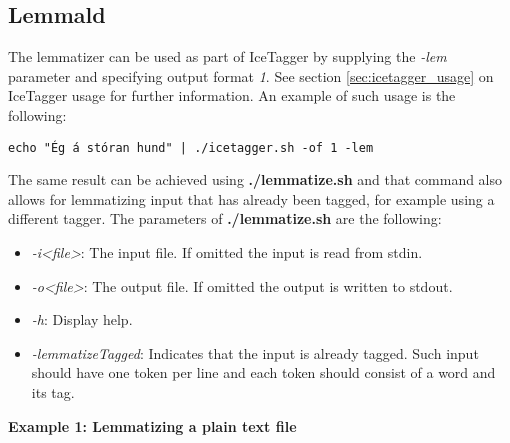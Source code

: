 \documentclass[11pt]{article}
\begin{document}



\subsection{Lemmald}
The lemmatizer can be used as part of IceTagger by supplying the \textit{-lem} parameter and specifying output
format \textit{1}. See section \ref{sec:icetagger_usage} on IceTagger usage for further information. 
An example of such usage is the following:

\begin{verbatim}
echo "Ég á stóran hund" | ./icetagger.sh -of 1 -lem 
\end{verbatim}

The same result can be achieved using \textbf{./lemmatize.sh} and that command also allows for lemmatizing
input that has already been tagged, for example using a different tagger. The parameters of \textbf{./lemmatize.sh}
are the following:
\begin{itemize}
 \item \textit{-i<file>}: The input file. If omitted the input is read from stdin.
 \item \textit{-o<file>}: The output file. If omitted the output is written to stdout.
 \item \textit{-h}: Display help.
 \item \textit{-lemmatizeTagged}: Indicates that the input is already tagged. Such input
      should have one token per line and each token should consist of a word and its tag.
\end{itemize}

\textbf{Example 1: Lemmatizing a plain text file}
\end{document}
